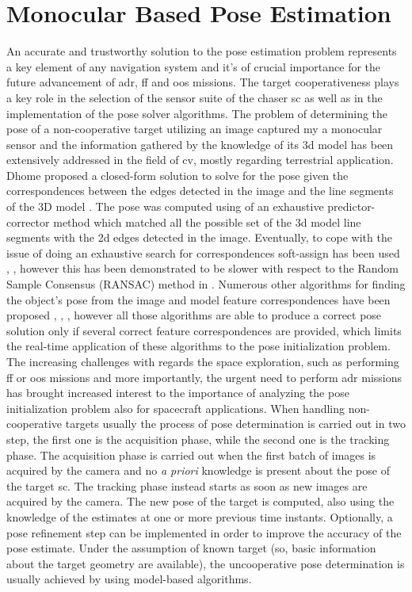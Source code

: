 \newpage

\section{Monocular Based Pose Estimation}
An accurate and trustworthy solution to the pose estimation problem represents a key element of any navigation system and it's of crucial importance for the future advancement of \acrshort{adr}, \acrshort{ff} and \acrshort{oos} missions. The target cooperativeness plays a key role in the selection of the sensor suite of the chaser \acrshort{sc} as well as in the implementation of the pose solver algorithms.
The problem of determining the pose of a non-cooperative target utilizing an image captured my a monocular sensor and the information gathered by the knowledge of its \acrshort{3d} model has been extensively addressed in the field of \acrshort{cv}, mostly regarding terrestrial application. Dhome proposed a closed-form solution to solve for the pose given the correspondences between the edges detected in the image and the line segments of the 3D model \cite{Dhome1989}. The pose was computed using of an exhaustive predictor-corrector method which matched all the possible set of the \acrshort{3d} model line segments with the \acrshort{2d} edges detected in the image. Eventually, to cope with the issue of doing an exhaustive search for correspondences soft-assign has been used \cite{Gold1994}, \cite{David2004}, however this has been demonstrated to be slower with respect to the Random Sample Consensus (RANSAC) method in \cite{Attia2016}. Numerous other algorithms for finding the object's pose from the image and model feature correspondences have been proposed \cite{Mirzaei2011}, \cite{Xu2017}, \cite{10.1007/s11263-008-0152-6}, however all those algorithms are able to produce a correct pose solution only if several correct feature correspondences are provided, which limits the real-time application of these algorithms to the pose initialization problem.
The increasing challenges with regards the space exploration, such as performing \acrshort{ff} or \acrshort{oos} missions and more importantly, the urgent need to perform \acrshort{adr} missions has brought increased interest to the importance of analyzing the pose initialization problem also for spacecraft applications. When handling non-cooperative targets usually the process of pose determination is carried out in two step, the first one is the acquisition phase, while the second one is the tracking phase. The acquisition phase is carried out when the first batch of images is acquired by the camera and no \textit{a priori} knowledge is present about the pose of the target \acrshort{sc}. The tracking phase instead starts as soon as new images are acquired by the camera. The new pose of the target is computed, also using the knowledge of the estimates at one or more previous time instants. Optionally, a pose refinement step can be implemented in order to improve the accuracy of the pose estimate. Under the assumption of known target (so, basic information about the target geometry are available), the uncooperative pose determination is usually achieved by using model-based algorithms.
